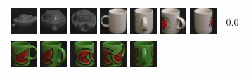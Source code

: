 {\begin{figure}[p]
\begin{tabular}{m{11cm} | m{3cm} |}
\includegraphics[width=1cm]{coil/beeld-27.eps}
\includegraphics[width=1cm]{coil/beeld-26.eps}
\includegraphics[width=1cm]{coil/beeld-29.eps}
\includegraphics[width=1cm]{coil/beeld-37.eps}
\includegraphics[width=1cm]{coil/beeld-41.eps}
\includegraphics[width=1cm]{coil/beeld-40.eps}
\includegraphics[width=1cm]{coil/beeld-38.eps}
& {\scriptsize 0.0}
\\
\includegraphics[width=1cm]{coil/beeld-30.eps}
\includegraphics[width=1cm]{coil/beeld-34.eps}
\includegraphics[width=1cm]{coil/beeld-32.eps}
\includegraphics[width=1cm]{coil/beeld-33.eps}
\includegraphics[width=1cm]{coil/beeld-35.eps}

\end{tabular}
\end{figure}}
